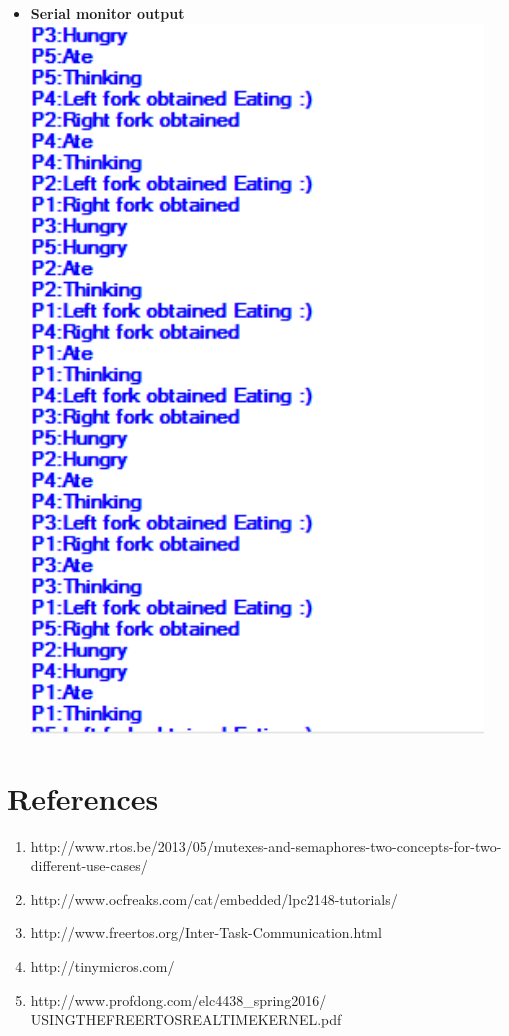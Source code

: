 \documentclass[11pt,a4paper]{article}
\begin{document}
\begin{itemize}
	
	\newpage
	\item \textbf{Serial monitor output}
	\\
	\includegraphics[width=12cm]{cont}
\end{itemize}
\newpage



	
	\section{References}
	\begin{enumerate}
	\item  http://www.rtos.be/2013/05/mutexes-and-semaphores-two-concepts-for-two-different-use-cases/
	
	\item http://www.ocfreaks.com/cat/embedded/lpc2148-tutorials/
	\item http://www.freertos.org/Inter-Task-Communication.html
	\item http://tinymicros.com/
	\item http://www.profdong.com/elc4438\_spring2016/\\USINGTHEFREERTOSREALTIMEKERNEL.pdf
	\end{enumerate}	
	
\end{document}
